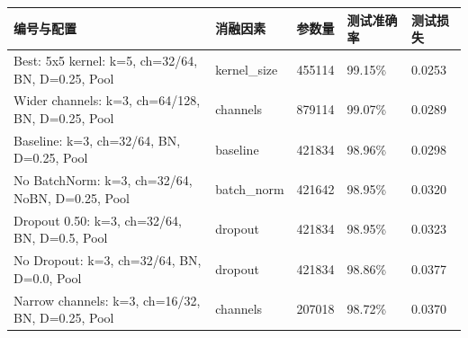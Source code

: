 \begin{tabular}{lllll}
\toprule
编号与配置 & 消融因素 & 参数量 & 测试准确率 & 测试损失 \\
\midrule
Best: 5x5 kernel: k=5, ch=32/64, BN, D=0.25, Pool & kernel\_size & 455114 & 99.15\% & 0.0253 \\
Wider channels: k=3, ch=64/128, BN, D=0.25, Pool & channels & 879114 & 99.07\% & 0.0289 \\
Baseline: k=3, ch=32/64, BN, D=0.25, Pool & baseline & 421834 & 98.96\% & 0.0298 \\
No BatchNorm: k=3, ch=32/64, NoBN, D=0.25, Pool & batch\_norm & 421642 & 98.95\% & 0.0320 \\
Dropout 0.50: k=3, ch=32/64, BN, D=0.5, Pool & dropout & 421834 & 98.95\% & 0.0323 \\
No Dropout: k=3, ch=32/64, BN, D=0.0, Pool & dropout & 421834 & 98.86\% & 0.0377 \\
Narrow channels: k=3, ch=16/32, BN, D=0.25, Pool & channels & 207018 & 98.72\% & 0.0370 \\
\bottomrule
\end{tabular}

